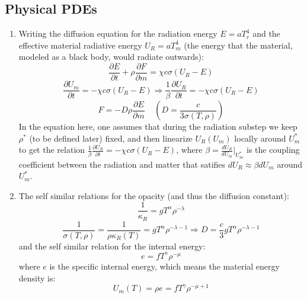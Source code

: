 \documentclass[11pt]{article}
\begin{document}
\subsection{Physical PDEs}
\begin{enumerate}
  \item Writing the diffusion equation for the radiation energy $E=aT_r^4$ and the effective material radiative energy $U_R = aT_m^4$ (the energy that the material, modeled as a black body, would radiate outwards):
  \begin{equation}
      \frac{\partial{E}}{\partial t}+\rho \frac{\partial F}{\partial m} = \chi c\sigma(U_R-E) 
  \end{equation}
  \begin{equation}
      \frac{\partial U_m}{\partial t}=-\chi c\sigma (U_R-E)\Rightarrow
      \frac{1}{\beta} \frac{\partial U_R}{\partial t}=-\chi c\sigma (U_R-E)
  \end{equation}
  \begin{equation}
      F=-D\rho\frac{\partial E}{\partial m}\;\;\;\;\left(D=\frac{c}{3\sigma(T,\rho)}\right)
  \end{equation}
  In the equation here, one assumes that during the radiation substep we keep $\rho^*$ (to be defined later) fixed, and then linearize $U_R(U_m)$ locally around $U_m^*$ to get the relation $\frac{1}{\beta} \frac{\partial U_R}{\partial t}=-\chi c\sigma (U_R-E)$, where $\beta = \frac{dU_R}{dU_m}|_{U_m^*}$ is the coupling coefficient between the radiation and matter that satifies $dU_R \approx \beta dU_m$ around $U_m^*$.
  \item The self similar relations for the opacity (and thus the diffusion constant):
  \begin{equation}
    \frac{1}{\kappa_R} = g T^\alpha \rho^{-\lambda}
  \end{equation}
  \begin{equation}
    \frac{1}{\sigma(T,\rho)} = \frac{1}{\rho\kappa_R(T)} = g T^\alpha \rho^{-\lambda - 1} \Rightarrow D = \frac{c}{3} g T^\alpha \rho^{-\lambda - 1}
  \end{equation}
  and the self similar relation for the internal energy:
  \begin{equation}
      e = f T^\gamma \rho^{-\mu}
  \end{equation}
  where $e$ is the specific internal energy, which means the material energy density is:
  \begin{equation}
      U_m(T) = \rho e = f T^\gamma \rho^{-\mu + 1}

\end{equation}
\end{enumerate}
\end{document}
